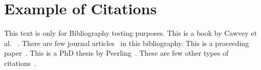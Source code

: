 \chapter{Example of Citations}

This text is only for Bibliography testing purposes. This is a book by Cawvey et al. ~\cite{Cawvey2017}. There are few journal articles~\cite{Pakzad2018, Adachi2007} in this bibliography. This is a proceeding paper~\cite{J.Fenwick2010}.  This is a PhD thesis by Peerling~\cite{PeerlingPhD1999}. These are few other types of citations~\cite{Panis2004}.